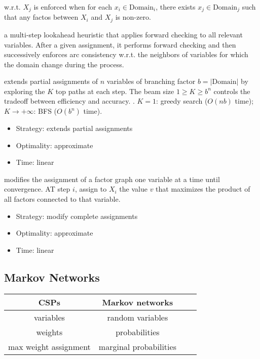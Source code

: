  w.r.t. $X_j$ is enforced when for each
$x_i \in \text{Domain}_i$, there exists $x_j \in \text{Domain}_j$ such that any
factos between $X_i$ and $X_j$ is non-zero.

 a multi-step lookahead heuristic that applies forward checking to all
relevant variables. After a given assignment, it performs forward checking and
then successively enforces arc consistency w.r.t. the neighbors of variables for
which the domain change during the process.

 extends partial assignments of $n$ variables of branching
factor $b = |\text{Domain}|$ by exploring the $K$ top paths at each step. The
beam size $1 \ge K \ge b^n$ controls the tradeoff between efficiency and
accuracy.
. $K=1$: greedy search ($O(nb)$ time); $K
\rightarrow +\infty$: BFS ($O(b^n)$ time).
\begin{itemize}
    \item Strategy: extends partial assignments
    \item Optimality: approximate
    \item Time: linear
\end{itemize}

 modifies the assignment of a
factor graph one variable at a time until convergence. AT step $i$, assign to
$X_i$ the value $v$ that maximizes the product of all factors connected to that
variable. 
\begin{itemize}
    \item Strategy: modify complete assignments
    \item Optimality: approximate
    \item Time: linear
\end{itemize}

\subsection{Markov Networks}

\begin{tabular}{|c|c|c|c|} 
    \hline
    \textbf{CSPs} & \textbf{Markov networks} \\
    \hline
    variables & random variables \\ 
    \hline
    weights & probabilities \\
    \hline
    max weight assignment & marginal probabilities \\
    \hline
\end{tabular}

